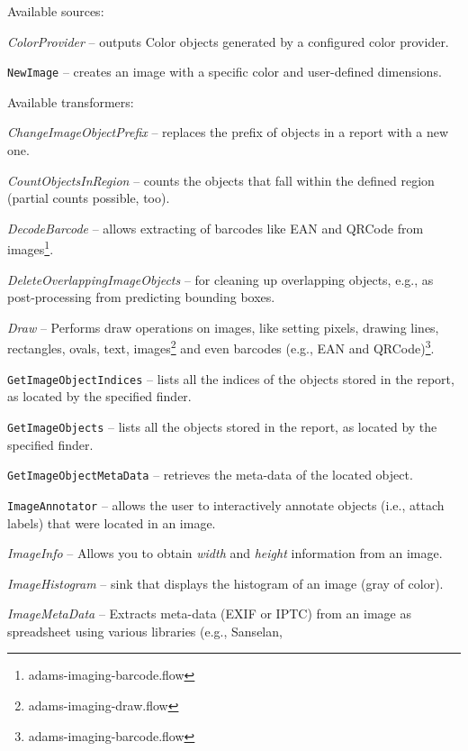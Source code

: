 \documentclass[a4paper]{book}
\begin{document}
\noindent Available sources:
\begin{tight_itemize}
	\item \textit{ColorProvider} -- outputs Color objects generated by a 
	configured color provider.
    \item \texttt{NewImage} -- creates an image with a specific color and
    user-defined dimensions.
\end{tight_itemize}

\noindent Available transformers:
\begin{tight_itemize}
	\item \textit{ChangeImageObjectPrefix} -- replaces the prefix of
	objects in a report with a new one.
	\item \textit{CountObjectsInRegion} -- counts the objects that fall
	within the defined region (partial counts possible, too).
	\item \textit{DecodeBarcode} -- allows extracting of barcodes like
	EAN and QRCode from images\footnote{adams-imaging-barcode.flow}.
	\item \textit{DeleteOverlappingImageObjects} -- for cleaning up
	overlapping objects, e.g., as post-processing from predicting bounding
	boxes.
	\item \textit{Draw} -- Performs draw operations on images, like setting
	pixels, drawing lines, rectangles, ovals, text, images\footnote{adams-imaging-draw.flow}
	and even barcodes (e.g., EAN and QRCode)\footnote{adams-imaging-barcode.flow}.
	\item \texttt{GetImageObjectIndices} -- lists all the indices of the objects
	stored in the report, as located by the specified finder.
	\item \texttt{GetImageObjects} -- lists all the objects stored in the
	report, as located by the specified finder.
	\item \texttt{GetImageObjectMetaData} -- retrieves the meta-data of
	the located object.
	\item \texttt{ImageAnnotator} -- allows the user to interactively
	 annotate objects (i.e., attach labels) that were located in an image.
	\item \textit{ImageInfo} -- Allows you to obtain \textit{width} and
	\textit{height} information from an image.
	\item \textit{ImageHistogram} -- sink that displays the histogram of an image
	(gray of color).
	\item \textit{ImageMetaData} -- Extracts meta-data (EXIF or IPTC) from an
	image as spreadsheet using various libraries (e.g., Sanselan\cite{sanselan}, 

\end{tight_itemize}
\end{document}
